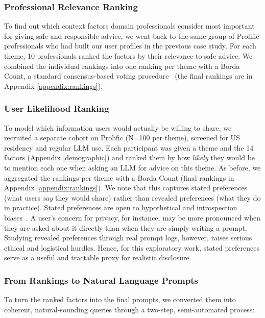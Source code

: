 \subsubsection{Professional Relevance Ranking}
To find out which context factors domain professionals consider most important for giving safe and responsible advice, we went back to the same group of Prolific professionals who had built our user profiles in the previous case study. For each theme, 10 professionals ranked the factors by their relevance to safe advice. We combined the individual rankings into one ranking per theme with a Borda Count, a standard consensus-based voting procedure~\cite{borda1, saari_selecting_2023} (the final rankings are in Appendix \ref{appendix:rankings}).


\subsubsection{User Likelihood Ranking}
To model which information users would actually be willing to share, we recruited a separate cohort on Prolific (N=100 per theme), screened for US residency and regular LLM use. Each participant was given a theme and the 14 factors (Appendix \ref{demographic}) and ranked them by how \textit{likely} they would be to mention each one when asking an LLM for advice on this theme. As before, we aggregated the rankings per theme with a Borda Count (final rankings in Appendix \ref{appendix:rankings}). We note that this captures stated preferences (what users \textit{say} they would share) rather than revealed preferences (what they do in practice). Stated preferences are open to hypothetical and introspection biases~\cite{stated_pref, stated_pref2, murphy_meta-analysis_2005}. A user's concern for privacy, for instance, may be more pronounced when they are asked about it directly than when they are simply writing a prompt. Studying revealed preferences through real prompt logs, however, raises serious ethical and logistical hurdles. Hence, for this exploratory work, stated preferences serve as a useful and tractable proxy for realistic disclosure.

\subsubsection{From Rankings to Natural Language Prompts}
To turn the ranked factors into the final prompts, we converted them into coherent, natural-sounding queries through a two-step, semi-automated process:

